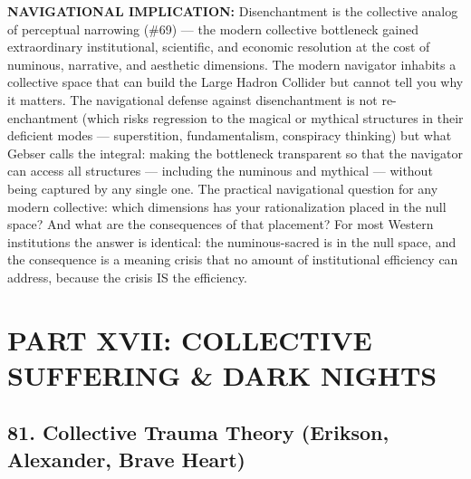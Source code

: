 \textbf{NAVIGATIONAL IMPLICATION:} Disenchantment is the collective analog of perceptual narrowing (\#69) — the modern collective bottleneck gained extraordinary institutional, scientific, and economic resolution at the cost of numinous, narrative, and aesthetic dimensions. The modern navigator inhabits a collective space that can build the Large Hadron Collider but cannot tell you why it matters. The navigational defense against disenchantment is not re-enchantment (which risks regression to the magical or mythical structures in their deficient modes — superstition, fundamentalism, conspiracy thinking) but what Gebser calls the integral: making the bottleneck transparent so that the navigator can access all structures — including the numinous and mythical — without being captured by any single one. The practical navigational question for any modern collective: which dimensions has your rationalization placed in the null space? And what are the consequences of that placement? For most Western institutions the answer is identical: the numinous-sacred is in the null space, and the consequence is a meaning crisis that no amount of institutional efficiency can address, because the crisis IS the efficiency.


\bigskip\noindent\makebox[\textwidth]{\color{rulegray}\rule{5cm}{0.3pt}}\bigskip


\chapter*{PART XVII: COLLECTIVE SUFFERING \& DARK NIGHTS}


\section*{81. Collective Trauma Theory (Erikson, Alexander, Brave Heart)}


